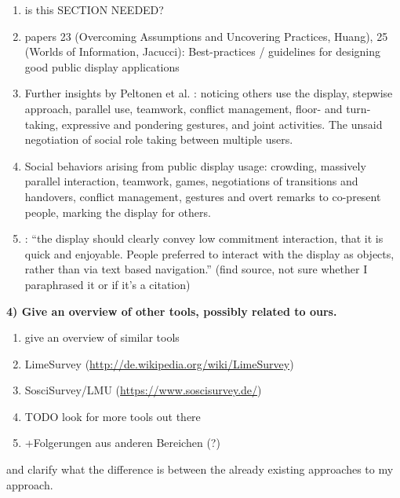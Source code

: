 		\begin{enumerate}
		\item is this SECTION NEEDED?

		\item papers 23 (Overcoming Assumptions and Uncovering Practices, Huang), 25 (Worlds of Information, Jacucci): Best-practices / guidelines for designing good public display applications


		\item Further insights by Peltonen et al. \cite{peltonen2008s}: noticing others use the display, stepwise approach, parallel use, teamwork, conflict management, floor- and turn-taking, expressive and pondering gestures, and joint activities. The unsaid negotiation of social role taking between multiple users.
		\item Social behaviors arising from public display usage: crowding, massively parallel interaction, teamwork, games, negotiations of transitions and handovers, conflict management, gestures and overt remarks to co-present people, marking the display for others. \cite{peltonen2008s}


		\item \cite{redhead2009designing}: ``the display should clearly convey low commitment interaction, that it is quick and enjoyable. People preferred to interact with the display as objects, rather than via text based navigation.'' (find source, not sure whether I paraphrased it or if it's a citation)

		\end{enumerate}



	\textbf{4) Give an overview of other tools, possibly related to ours.}

		\begin{enumerate}
		\item give an overview of similar tools
		\item LimeSurvey (\url{http://de.wikipedia.org/wiki/LimeSurvey})
		\item SosciSurvey/LMU (\url{https://www.soscisurvey.de/})
		\item TODO look for more tools out there
		\item +Folgerungen aus anderen Bereichen (?)
		\end{enumerate}

		and clarify what the difference is between the already existing approaches to my approach.






